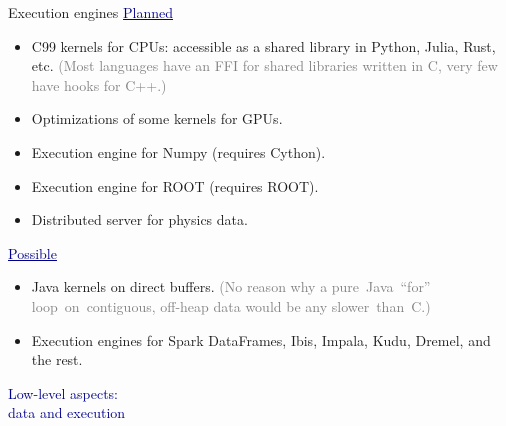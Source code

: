 \documentclass{beamer}
\begin{document}
\begin{frame}{Execution engines}
\vspace{0.5 cm}
\textcolor{darkblue}{\underline{Planned}}

\begin{itemize}
\item C99 kernels for CPUs: accessible as a shared library in Python, Julia, Rust, etc. \textcolor{gray}{(Most languages have an FFI for shared libraries written in C, very few have hooks for C++.)}
\item Optimizations of some kernels for GPUs.
\item Execution engine for Numpy (requires Cython).
\item Execution engine for ROOT (requires ROOT).
\item Distributed server for physics data.
\end{itemize}

\vspace{0.25 cm}
\textcolor{darkblue}{\underline{Possible}}

\begin{itemize}
\item Java kernels on direct buffers. \textcolor{gray}{(No reason why a \mbox{pure Java ``for''\hspace{-0.5 cm}} \mbox{loop on contiguous,} off-heap data would be any \mbox{slower than C.)\hspace{-1 cm}}}
\item Execution engines for Spark DataFrames, Ibis, Impala, Kudu, Dremel, and the rest.
\end{itemize}
\end{frame}

\begin{frame}{}
\begin{center}
\textcolor{darkblue}{\huge Low-level aspects: \\\vspace{0.25 cm} data and execution}
\end{center}
\end{frame}
\end{document}
